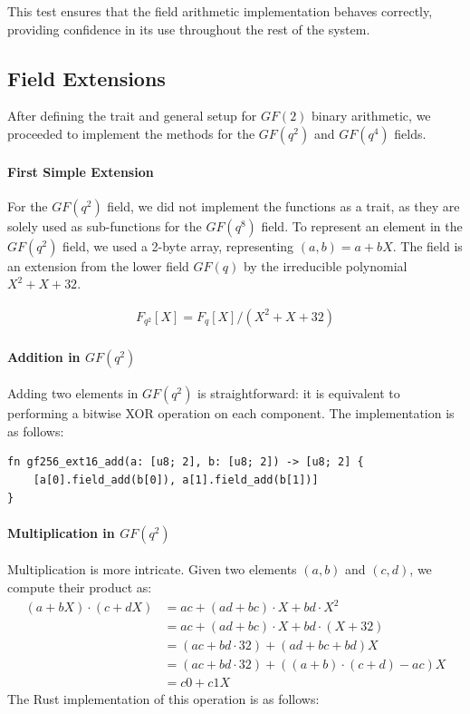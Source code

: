 \documentclass[11pt]{report}
\theoremstyle{definition}
\theoremstyle{plain}
\begin{document}
This test ensures that the field arithmetic implementation behaves correctly, providing confidence in its use throughout the rest of the system.

\subsection{Field Extensions}\label{sub:field_extensions}
After defining the trait and general setup for $GF(2)$ binary arithmetic, we proceeded to implement the methods for the $GF(q^2)$ and $GF(q^4)$ fields.

\paragraph{First Simple Extension}\label{sec:first_simple_extension}

For the $GF(q^2)$ field, we did not implement the functions as a trait, as they are solely used as sub-functions for the $GF(q^8)$ field. To represent an element in the $GF(q^2)$ field, we used a 2-byte array, representing $(a, b) = a + bX$. The field is an extension from the lower field $GF(q)$ by the irreducible polynomial $X^2 + X + 32$.

\begin{align}
  F_{q^2}[X] = F_q[X] / (X^2 + X + 32)
\end{align}

\paragraph{Addition in $GF(q^2)$}

Adding two elements in $GF(q^2)$ is straightforward: it is equivalent to performing a bitwise XOR operation on each component. The implementation is as follows:

\begin{verbatim}
fn gf256_ext16_add(a: [u8; 2], b: [u8; 2]) -> [u8; 2] {
    [a[0].field_add(b[0]), a[1].field_add(b[1])]
}
\end{verbatim}

\paragraph{Multiplication in $GF(q^2)$}

Multiplication is more intricate. Given two elements $(a, b)$ and $(c, d)$, we compute their product as:
\begin{align}
  (a + bX) \cdot (c + dX) & = ac + (ad + bc) \cdot X + bd \cdot X^2              \\
                          & = ac + (ad + bc) \cdot X + bd \cdot (X + 32)         \\
                          & = (ac + bd \cdot 32) + (ad + bc + bd)X               \\
                          & = (ac + bd \cdot 32) + ((a + b) \cdot (c + d) - ac)X \\
                          & = c0 + c1X
\end{align}
The Rust implementation of this operation is as follows:
\end{document}
